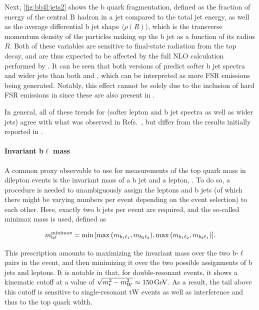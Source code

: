 Next, \cref{fig:bb4l:jets2} shows the b quark fragmentation, defined as the fraction of energy of the central B hadron in a jet compared to the total jet energy, as well as the average differential b jet shape $\langle \rho (R) \rangle$, which is the transverse momentum density of the particles making up the b jet as a function of its radius $R$. Both of these variables are sensitive to final-state radiation from the top decay, and are thus expected to be affected by the full NLO calculation performed by \bbfourl. It can be seen that both versions of \bbfourl predict softer b jet spectra and wider jets than both \tttWsum and \ttb, which can be interpreted as more FSR emissions being generated. Notably, this effect cannot be solely due to the inclusion of hard FSR emissions in \bbfourl since these are also present in \ttb.

In general, all of these trends for \bbfourl (softer lepton and b jet spectra as well as wider jets) agree with what was observed in Refs.~\cite{FerrarioRavasio:2018whr,ATLAS:PHYS-PUB-2021-042}, but differ from the results initially reported in .

\paragraph{Invariant b$\ell$ mass} A common proxy observable to use for measurements of the top quark mass in dilepton events is the invariant mass of a b jet and a lepton, \mbl. To do so, a procedure is needed to unambiguously assign the leptons and b jets (of which there might be varying numbers per event depending on the event selection) to each other. Here, exactly two b jets per event are required, and the so-called minimax mass is used, defined as

\begin{equation}
    m_{\mathrm{b \ell}}^{\mathrm{minimax}} = \min{ \left[  \max{ \left( m_{b_1 \ell_1},
          m_{b_2 \ell_2} \right) }, \max{ \left( m_{b_1 \ell_2},
          m_{b_2 \ell_1} \right) } \right] }.
\end{equation}

This prescription amounts to maximizing the invariant mass over the two b-$\ell$ pairs in the event, and then minimizing it over the two possible assignments of b jets and leptons. It is notable in that, for double-resonant \ttbar events, it shows a kinematic cutoff at a value of $\sqrt{\smash[b]{m_t^2 - m_W^2}} \approx \SI{150}{\GeV}$. As a result, the tail above this cutoff is sensitive to single-resonant tW events as well as \tttW interference and thus to the top quark width.


